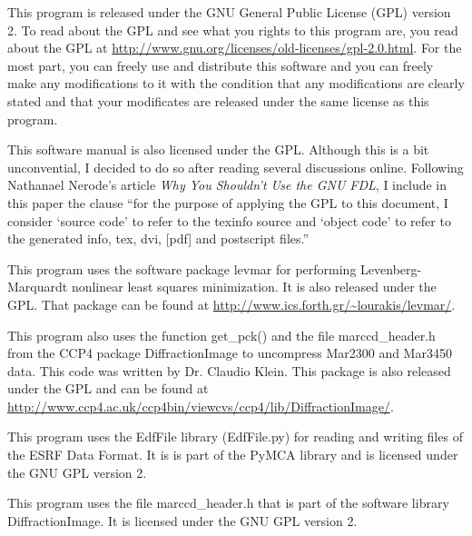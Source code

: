 This program is released under the GNU General
Public License (GPL) version 2.
To read about
the GPL and see what you rights to this program are,
you read about the GPL at
\url{http://www.gnu.org/licenses/old-licenses/gpl-2.0.html}.
For the most part, you can freely use and distribute 
this software and you can freely make any modifications to 
it with the condition that any modifications are clearly stated 
and that your modificates are released under the same license as
this program.

This software manual is also licensed under the GPL. Although
this is a bit unconvential, I decided to do so after reading
several discussions online. Following Nathanael Nerode's 
article {\em Why You Shouldn't Use the GNU FDL}, I include in
this paper the clause ``for the purpose of applying the GPL to 
this document, I consider `source code' to refer to the texinfo 
source and `object code' to refer to the generated info, tex, 
dvi, [pdf] and postscript files.''\cite{Nerode03}

This program uses the software package
levmar for performing Levenberg-Marquardt nonlinear
least squares minimization.
It is also released under the GPL. That package can be 
found at \url{http://www.ics.forth.gr/~lourakis/levmar/}.\cite{lourakis04LM}

This program also uses the function get\_pck() and the file
marccd\_header.h from the CCP4 package
DiffractionImage to uncompress Mar2300 and Mar3450 data. This code was
written by Dr. Claudio Klein. This package is 
also released under the GPL and can be found at
\url{http://www.ccp4.ac.uk/ccp4bin/viewcvs/ccp4/lib/DiffractionImage/}.\cite{Klein95}

This program uses the EdfFile library (EdfFile.py) for reading and 
writing files of the ESRF Data Format. It is is part of the PyMCA 
library and is licensed under the GNU GPL version 2.\cite{PyMCA}

This program uses the file marccd\_header.h that is part of the
software library DiffractionImage. It is licensed under
the GNU GPL version 2.\cite{DiffractionImage}


